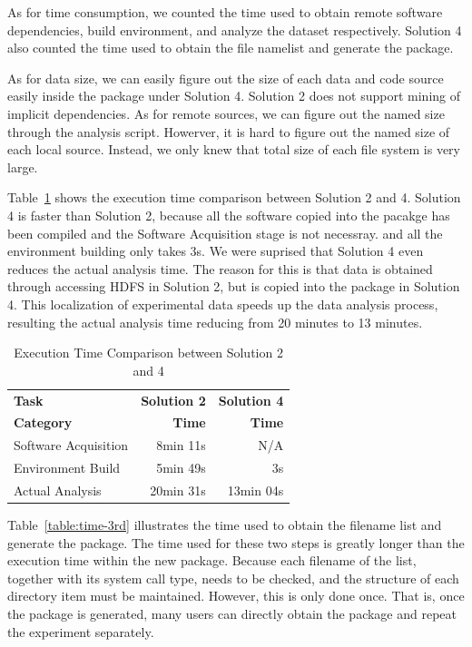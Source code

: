 \documentclass{sig-alternate}
\begin{document}
As for time consumption, we counted the time used to obtain remote software dependencies, build environment, and analyze the dataset respectively. Solution 4 also counted the time used to obtain the file namelist and generate the package. 

As for data size, we can easily figure out the size of each data and code source easily inside the package under Solution 4.
Solution 2 does not support mining of implicit dependencies. As for remote sources, we can figure out the named size through the analysis script. Howerver, it is hard to figure out the named size of each local source. 
Instead, we only knew that total size of each file system is very large.

Table~\ref{table:time-2nd3rd} shows the execution time comparison between
Solution 2 and 4.
Solution 4 is faster than Solution 2, because all the software copied into the pacakge has been compiled and the Software Acquisition stage is not necessray.
and all the environment building only takes 3s.
We were suprised that Solution 4 even reduces the actual analysis time. 
The reason for this is that data is obtained through accessing HDFS in Solution 2, but is copied into the package in Solution 4. This localization of experimental data speeds up the data analysis process, resulting the actual analysis time reducing from 20 minutes to 13 minutes.

\begin{table}
    \centering
    \begin{tabular}{|l|r|r|}
    \hline
    \bf Task & \bf Solution 2& \bf Solution 4\\ 
    \bf Category & \bf Time & \bf Time \\ \hline
    Software Acquisition & 8min 11s & N/A \\ \hline
    Environment Build & 5min 49s  & 3s \\ \hline
    Actual Analysis & 20min 31s & 13min 04s \\ \hline
    \end{tabular}
    \caption{Execution Time Comparison between Solution 2 and 4}
    \label{table:time-2nd3rd}
\end{table}    

Table~\ref{table:time-3rd} illustrates the time used to
obtain the filename list and generate the package. 
The time used for these two steps is greatly longer than the execution time
within the new package. 
Because each filename of the list, together with its system call type, needs to be checked, and the structure of each directory item must be maintained.
However, 
this is only done once.
That is, once the package is
generated, many users can directly obtain the package and repeat the experiment
separately. 
\end{document}
